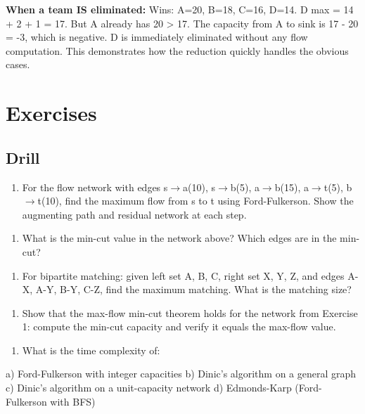 \textbf{When a team IS eliminated:} Wins: A=20, B=18, C=16, D=14. D max = 14 + 2 + 1 = 17. But A already has 20 > 17. The capacity from A to sink is 17 - 20 = -3, which is negative. D is immediately eliminated without any flow computation. This demonstrates how the reduction quickly handles the obvious cases.

\section{Exercises}

\subsection{Drill}

\begin{enumerate}
\item For the flow network with edges s$\to $a(10), s$\to $b(5), a$\to $b(15), a$\to $t(5), b$\to $t(10), find the maximum flow from s to t using Ford-Fulkerson. Show the augmenting path and residual network at each step.
\end{enumerate}

\begin{enumerate}
\item What is the min-cut value in the network above? Which edges are in the min-cut?
\end{enumerate}

\begin{enumerate}
\item For bipartite matching: given left set {A, B, C}, right set {X, Y, Z}, and edges A-X, A-Y, B-Y, C-Z, find the maximum matching. What is the matching size?
\end{enumerate}

\begin{enumerate}
\item Show that the max-flow min-cut theorem holds for the network from Exercise 1: compute the min-cut capacity and verify it equals the max-flow value.
\end{enumerate}

\begin{enumerate}
\item What is the time complexity of:
\end{enumerate}
   a) Ford-Fulkerson with integer capacities
   b) Dinic's algorithm on a general graph
   c) Dinic's algorithm on a unit-capacity network
   d) Edmonds-Karp (Ford-Fulkerson with BFS)

